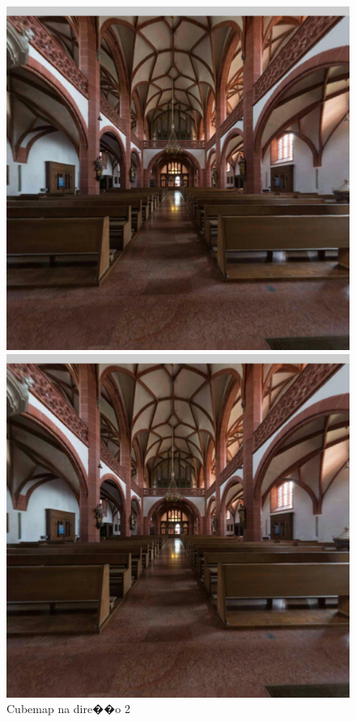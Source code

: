 \documentclass[12pt]{article}
\begin{document}
\begin{figure}[!tbp]
  \centering
  \begin{minipage}[b]{0.3\textwidth}
    \includegraphics[width=1.1\textwidth]{../images/screenshots/Screenshot_5_Equi2Cube.jpg}
    \caption{Cubemap na dire��o 2}
    \label{fig:cubemap_direction_2}
  \end{minipage}
  \hfill
  \begin{minipage}[b]{0.3\textwidth}
    \centering
    \includegraphics[width=1.1\textwidth]{../images/screenshots/Screenshot_5_Skybox.jpg}

\end{minipage}
\end{figure}
\end{document}
